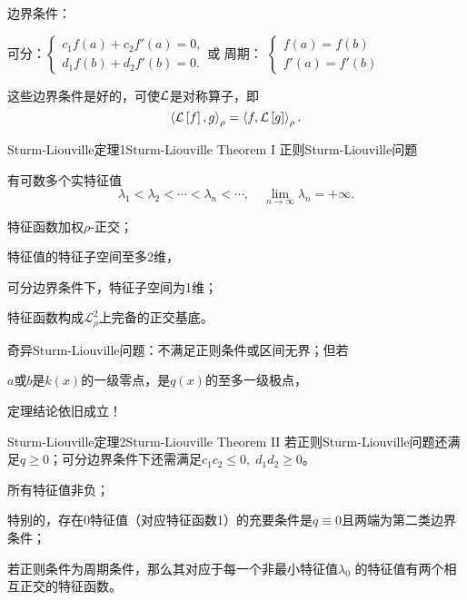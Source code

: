 边界条件：
\begin{center}
	可分：$\begin{cases}
			c_1f(a)+c_2f'(a)=0, \\
			d_1f(b)+d_2f'(b)=0.
		\end{cases}$\quad 或 \quad 周期：
	$\begin{cases}
			f(a)=f(b) \\
			f'(a)=f'(b)
		\end{cases}$
\end{center}
这些边界条件是好的，可使$\mathcal L$是对称算子，即
\[
	\left\langle \mathcal L\left[f\right],g\right\rangle_\rho=\left\langle f,\mathcal L\left[g\right]\right\rangle_\rho.
\]
\begin{theorem}{Sturm-Liouville定理1}{Sturm-Liouville Theorem I}
	正则Sturm-Liouville问题
	\begin{compactenum}
		\item 有可数多个实特征值
		      \[
				\lambda_1<\lambda_2<\cdots<\lambda_n<\cdots,\quad\lim_{n\to\infty}\lambda_n=+\infty.
			  \]
		\item 特征函数加权$\rho$\;-\;正交；
		\item 特征值的特征子空间至多2维，

		      可分边界条件下，特征子空间为1维；
		\item 特征函数构成$\mathscr L_\rho^2$上完备的正交基底。
	\end{compactenum}
\end{theorem}
奇异Sturm-Liouville问题：不满足正则条件或区间无界；但若
\begin{center}
	$a$或$b$是$k(x)$的一级零点，是$q(x)$的至多一级极点， %
\end{center}
定理结论依旧成立！
\begin{theorem}{Sturm-Liouville定理2}{Sturm-Liouville Theorem II}
	若正则Sturm-Liouville问题还满足$q\geqslant 0$；可分边界条件下还需满足$c_1c_2\leqslant 0,\;d_1d_2\geqslant 0$。
	\begin{compactenum}
		\item 所有特征值非负；

		      特别的，存在0特征值（对应特征函数1）的充要条件是$q\equiv 0$且两端为第二类边界条件；
		\item 若正则条件为周期条件，那么其对应于每一个非最小特征值$\lambda_0$
		的特征值有两个相互正交的特征函数。
	\end{compactenum}
\end{theorem}
